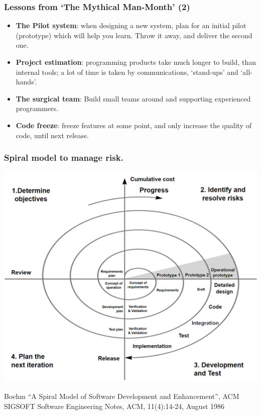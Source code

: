 \documentclass{beamer} %
\newcommand\emc[1]{\textcolor{midred}{\textbf{#1}}}
\begin{document}
\begin{frame}
\frametitle{Lessons from `The Mythical Man-Month' (2)}

\begin{itemize}
  \item \emc{The Pilot system}: when designing a new system, plan for an initial pilot (prototype) which will help you learn. Throw it away, and deliver the second one.
  \item \emc{Project estimation}: programming products take much longer to build, than internal tools; a lot of time is taken by communications, `stand-ups' and `all-hands'.
  \item \emc{The surgical team}: Build small teams around and supporting experienced programmers.
  \item \emc{Code freeze}: freeze features at some point, and only increase the quality of code, until next release.
\end{itemize}

\end{frame}

\begin{frame}
\frametitle{Spiral model to manage risk.}

\begin{center}
\includegraphics[scale=0.27]{assets/spiral}
\end{center}

{\small Boehm ``A Spiral Model of Software Development and Enhancement'', ACM SIGSOFT Software Engineering Notes, ACM, 11(4):14-24, August 1986}

\end{frame}
\end{document}
